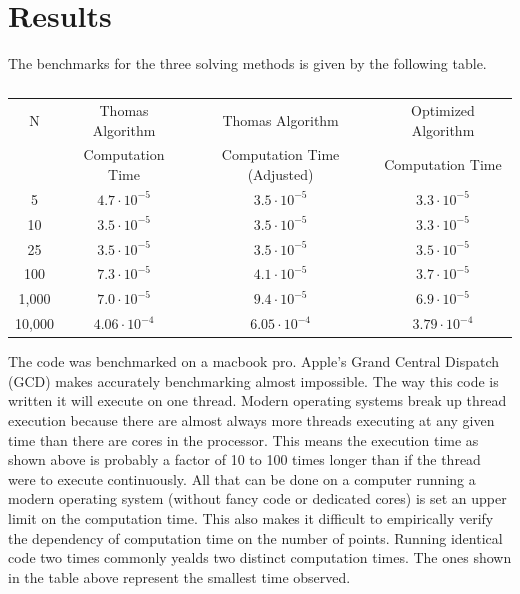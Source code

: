 \documentclass{article}
\begin{document}
\section{Results}
The benchmarks for the three solving methods is given by the following table.

\begin{table}[H]
	\centering
	\begin{tabular}{ c | c | c | c }
		N      &  Thomas Algorithm    &       Thomas Algorithm      & Optimized Algorithm  \\
		       &  Computation Time    & Computation Time (Adjusted) &  Computation Time    \\
		\hline
		5      & $4.7 \cdot 10^{-5}$  &     $3.5 \cdot 10^{-5}$     & $3.3 \cdot 10^{-5}$  \\
		\hline
		10     & $3.5 \cdot 10^{-5}$  &     $3.5 \cdot 10^{-5}$     & $3.3 \cdot 10^{-5}$  \\
		\hline
		25     & $3.5 \cdot 10^{-5}$  &     $3.5 \cdot 10^{-5}$     & $3.5 \cdot 10^{-5}$  \\
		\hline
		100    & $7.3 \cdot 10^{-5}$  &     $4.1 \cdot 10^{-5}$     & $3.7 \cdot 10^{-5}$  \\
		\hline
		1,000  & $7.0 \cdot 10^{-5}$  &     $9.4 \cdot 10^{-5}$     & $6.9 \cdot 10^{-5}$  \\
		\hline
		10,000 & $4.06 \cdot 10^{-4}$ &     $6.05 \cdot 10^{-4}$    & $3.79 \cdot 10^{-4}$
	\end{tabular}
	\caption{ \label{table:}}
\end{table}

The code was benchmarked on a macbook pro.  Apple’s Grand Central Dispatch (GCD) makes accurately benchmarking almost impossible.  The way this code is written it will execute on one thread.  Modern operating systems break up thread execution because there are almost always more threads executing at any given time than there are cores in the processor.  This means the execution time as shown above is probably a factor of 10 to 100 times longer than if the thread were to execute continuously.  All that can be done on a computer running a modern operating system (without fancy code or dedicated cores) is set an upper limit on the computation time.  This also makes it difficult to empirically verify the dependency of computation time on the number of points.  Running identical code two times commonly yealds two distinct computation times.  The ones shown in the table above represent the smallest time observed.
\end{document}

